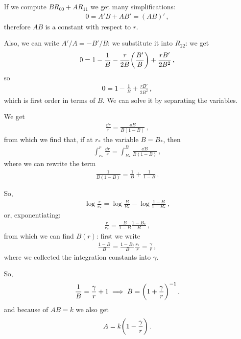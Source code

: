 \documentclass[main.tex]{subfiles}
\begin{document}
If we compute \(BR_{00} + A R_{11}\) we get many simplifications:
%
\begin{align}
  0 = A'B + AB' = (AB)'
\,,
\end{align}
%
therefore \(AB\) is a constant with respect to \(r\).

Also, we can write \(A' / A = - B' / B\): we substitute it into \(R_{22}\): we get 
%
\begin{align}
  0= 1 - \frac{1}{B} - \frac{r}{2B} \qty(\frac{B'}{B}) + \frac{rB'}{2B^2}
\,,
\end{align}
%
so 
%
\begin{align}
  0 = 1 - \frac{1}{B} + \frac{rB'}{2B^2}
\,,
\end{align}
%
which is first order in terms of \(B\). We can solve it by separating the variables.

We get 
%
\begin{align}
  \frac{\dd{r}}{r} = \frac{ \dd{B}}{B(1-B)}
\,,
\end{align}
%
from which we find that, if at \(r_{*}\) the variable \(B = B_{*}\), then 
%
\begin{align}
    \int _{r_{*}}^{r}\frac{\dd{r}}{r} = 
    \int _{B_{*}}^{B}  \frac{ \dd{B}}{B(1-B)}
\,,
\end{align}
%
where we can rewrite the term 
%
\begin{align}
  \frac{1}{B(1-B)} = \frac{1}{B} + \frac{1}{1-B}
\,.
\end{align}

So, 
%
\begin{align}
  \log \frac{r}{r_{*}} = \log \frac{B}{B_{*}} - \log \frac{1-B}{1-B_{*}}
\,,
\end{align}
%
or, exponentiating: 
%
\begin{align}
  \frac{r}{r_{*}} = \frac{B}{1-B} \frac{1-B_{*}}{B}
\,,
\end{align}
%
from which we can find \(B(r)\): first we write 
%
\begin{align}
  \frac{1-B}{B} = \frac{1-B_{*}}{B} \frac{r_{*}}{r} = \frac{\gamma }{r}
\,,
\end{align}
%
where we collected the integration constants into \(\gamma \).

So, 
%
\begin{align}
  \frac{1}{B} = \frac{\gamma}{r} + 1 \implies B = \qty(1 + \frac{ \gamma }{r})^{-1}
\,.
\end{align}
%
and because of \(AB = k\) we also get 
%
\begin{align}
  A = k \qty(1 - \frac{\gamma}{r})
\,.
\end{align}
\end{document}
